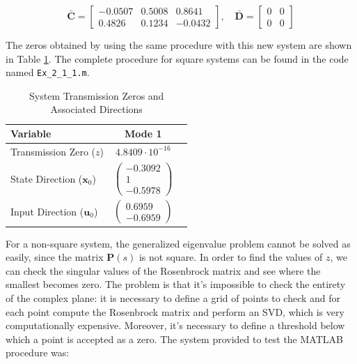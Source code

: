 \documentclass{scrreprt}
\begin{document}
\begin{equation}
    \bar{\boldsymbol{C}} = 
    \begin{bmatrix}
        -0.0507 & 0.5008 &  0.8641 \\
         0.4826 & 0.1234 & -0.0432
    \end{bmatrix}, \quad
    \bar{\boldsymbol{D}} = 
    \begin{bmatrix}
        0 & 0 \\
        0 & 0
    \end{bmatrix}
\end{equation}

The zeros obtained by using the same procedure with this new system are shown in Table \ref{tab:transmission_zeros}. The complete procedure for square systems can be found in the code named \texttt{Ex\_2\_1\_1.m}.

\begin{table}[h]
    \centering
    \caption{System Transmission Zeros and Associated Directions}
    \label{tab:transmission_zeros}
    \renewcommand{\arraystretch}{1.5}
    \begin{tabular}{lcc}
        \toprule
        \textbf{Variable} & \textbf{Mode 1} \\ 
        \midrule
        Transmission Zero ($z$) & $4.8409  \cdot 10^{-16}$ \\ 
        \midrule
        State Direction ($\boldsymbol{x}_0$) & 
        $\begin{pmatrix} -0.3092 \\ 1 \\ -0.5978  \end{pmatrix}$ \\ 
        \midrule
        Input Direction ($\boldsymbol{u}_0$) & 
        $\begin{pmatrix} 0.6959 \\ -0.6959 \end{pmatrix}$ \\ 
        \bottomrule
    \end{tabular}

\end{table}

For a non-square system, the generalized eigenvalue problem cannot be solved as easily, since the matrix $\boldsymbol{P}(s)$ is not square. In order to find the values of $z$, we can check the singular values of the Rosenbrock matrix and see where the smallest becomes zero. The problem is that it's impossible to check the entirety of the complex plane: it is necessary to define a grid of points to check and for each point compute the Rosenbrock matrix and perform an SVD, which is very computationally expensive. 
Moreover, it's necessary to define a threshold below which a point is accepted as a zero.
The system provided to test the MATLAB procedure was:
\end{document}

